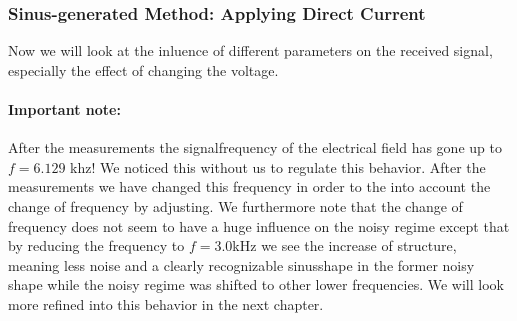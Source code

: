 \subsubsection{Sinus-generated Method: Applying Direct Current}
Now we will look at the inluence of different parameters on
the received signal, especially the effect of changing the
voltage. 
\paragraph{Important note:} After the measurements the
signalfrequency of the electrical field has gone up to 
$f=6.129$ khz! We noticed this without us to regulate this 
behavior. After the measurements we have changed this frequency in
order to the into account the change of frequency by adjusting.
We furthermore note that the change of frequency
does not seem to have a huge influence on the noisy regime except
that by reducing the frequency to $f=3.0$kHz we see the increase
of structure, meaning less noise and a clearly recognizable
sinusshape in the former noisy shape while the noisy regime
was shifted to other lower frequencies. We will look more refined
into this behavior in the next chapter.
